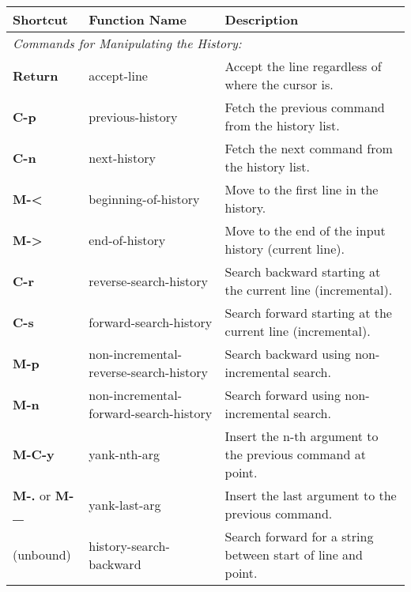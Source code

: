 \documentclass{article}
\begin{document}
\vfill




\newpage

\mbox{}

\begin{tabular}{|p{3.5cm}|p{4cm}|p{10cm}|}
\hline
\large\textbf{Shortcut} & \large\textbf{Function Name} & \large\textbf{Description} \\
\hline
\multicolumn{3}{|l|}{\small\it{Commands for Manipulating the History:}} \\
\hline
\textbf{Return} & accept-line & Accept the line regardless of where the cursor is. \\
\hline
\textbf{C-p} & previous-history & Fetch the previous command from the history list. \\
\hline
\textbf{C-n} & next-history & Fetch the next command from the history list. \\
\hline
\textbf{M-\textless} & beginning-of-history & Move to the first line in the history. \\
\hline
\textbf{M-\textgreater} & end-of-history & Move to the end of the input history (current line). \\
\hline
\textbf{C-r} & reverse-search-history & Search backward starting at the current line (incremental). \\
\hline
\textbf{C-s} & forward-search-history & Search forward starting at the current line (incremental). \\
\hline
\textbf{M-p} & non-incremental-reverse-search-history & Search backward using non-incremental search. \\
\hline
\textbf{M-n} & non-incremental-forward-search-history & Search forward using non-incremental search. \\
\hline
\textbf{M-C-y} & yank-nth-arg & Insert the n-th argument to the previous command at point. \\
\hline
\textbf{M-.} or \textbf{M-\_}& yank-last-arg & Insert the last argument to the previous command. \\
\hline
(unbound) & history-search-backward & Search forward for a string between start of line and point. \\

\end{tabular}
\end{document}
